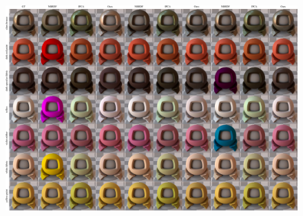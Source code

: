 \begin{figure}[t]
%
  {\includegraphics[width=0.9\linewidth]{Chapters/hyperbrdf-figs/imp_comp_upt_3vals.pdf}}


\end{figure}
